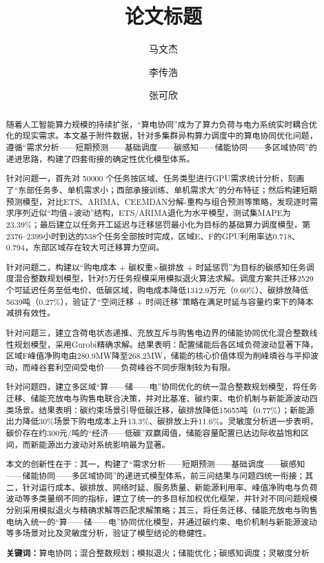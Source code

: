 \documentclass{ctexart}
\title{论文标题}
\date{}
\author{马文杰\and 李传浩\and 张可欣}
\begin{document}
\maketitle
\begin{abstract}
随着人工智能算力规模的持续扩张，“算电协同”成为了算力负荷与电力系统实时耦合优化的现实需求。本文基于附件数据，针对多集群异构算力调度中的算电协同优化问题，遵循“需求分析——短期预测——基础调度——碳感知——储能协同——多区域协同”的递进思路，构建了四套衔接的确定性优化模型体系。

针对问题一，首先对 50000 个任务按区域、任务类型进行GPU需求统计分析，刻画了“东部任务多、单机需求小；西部承接训练、单机需求大”的分布特征；然后构建短期预测模型，对比ETS、ARIMA、CEEMDAN分解-重构与组合预测等策略，发现逐时需求序列近似“均值+波动”结构，ETS/ARIMA退化为水平模型，测试集MAPE为23.39\%；最后建立以任务开工延迟与迁移惩罚最小化为目标的基础算力调度模型，第2376–2399小时到达的538个任务全部按时完成，区域E、F的GPU利用率达0.718、0.794，东部区域存在较大可迁移算力空间。

针对问题二，构建以“购电成本 + 碳权重×碳排放 + 时延惩罚”为目标的碳感知任务调度混合整数规划模型，针对5万任务规模采用模拟退火算法求解。调度方案共迁移2529个可延迟任务至低电价、低碳区域，购电成本降低1312.9万元（0.60\%）、碳排放降低5639吨（0.27\%），验证了“空间迁移 + 时间迁移”策略在满足时延与容量约束下的降本减排有效性。

针对问题三，建立含荷电状态递推、充放互斥与购售电边界的储能协同优化混合整数线性规划模型，采用Gurobi精确求解。结果表明：配置储能后各区域负荷波动显著下降，区域F峰值净购电由280.9MW降至268.2MW，储能的核心价值体现为削峰填谷与平抑波动，而峰谷套利空间受电价——负荷峰谷不同步限制较为有限。

针对问题四，建立多区域“算——储——电”协同优化的统一混合整数规划模型，将任务迁移、储能充放电与购售电联合决策，并对比基准、碳约束、电价机制与新能源波动四类场景。结果表明：碳约束场景引导低碳迁移，碳排放降低15655吨（0.77\%）；新能源出力降低30\%场景下购电成本上升13.3\%、碳排放上升11.6\%。灵敏度分析进一步表明，碳价存在约300元/吨的“经济——低碳”双赢阈值，储能容量配置已达边际收益饱和区间，而新能源出力波动对系统影响最为显著。

本文的创新性在于：其一，构建了“需求分析——短期预测——基础调度——碳感知——储能协同——多区域协同”的递进式模型体系，前三问结果与问题四统一衔接；其二，针对运行成本、碳排放、网络时延、服务质量、新能源利用率、峰值净购电与负荷波动等多类量纲不同的指标，建立了统一的多目标加权优化框架，并针对不同问题规模分别采用模拟退火与精确求解等匹配求解策略；其三，将任务迁移、储能充放电与购售电纳入统一的“算——储——电”协同优化模型，并通过碳约束、电价机制与新能源波动等多场景对比及灵敏度分析，验证了模型结论的稳健性。

\vspace{0.3em}
\noindent\textbf{关键词：}算电协同；混合整数规划；模拟退火；储能优化；碳感知调度；灵敏度分析
\end{abstract}
\newpage
\end{document}
